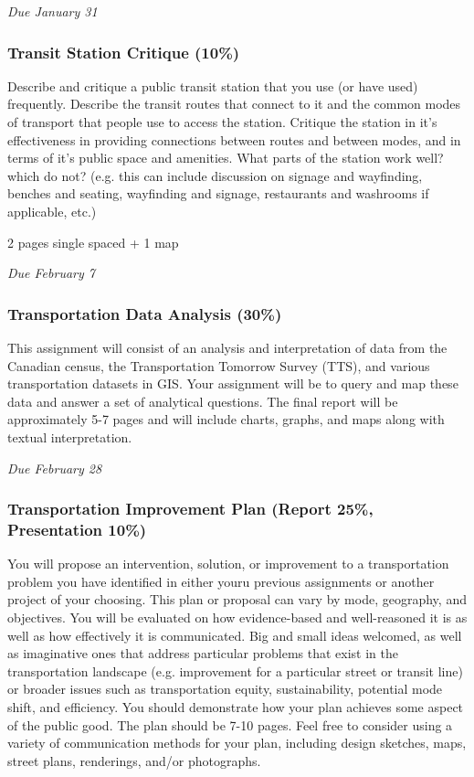 \documentclass[11pt]{article}
\begin{document}
	\textit{Due January 31}
	
	
	\subsubsection*{Transit Station Critique (10\%)}
	
	Describe and critique a public transit station that you use (or have used) frequently. Describe the transit routes that connect to it and the common modes of transport that people use to access the station. Critique the station in it's effectiveness in providing connections between routes and between modes, and in terms of it's public space and amenities. What parts of the station work well? which do not? (e.g. this can include discussion on signage and wayfinding, benches and seating, wayfinding and signage, restaurants and washrooms if applicable, etc.)
	
	2 pages single spaced + 1 map
	
	\textit{Due February 7}
	
	
	
	
	\subsubsection*{Transportation Data Analysis (30\%)}
	
	This assignment will consist of an analysis and interpretation of data from the Canadian census, the Transportation Tomorrow Survey (TTS), and various transportation datasets in GIS. Your assignment will be to query and map these data and answer a set of analytical questions. The final report will be approximately 5-7 pages and will include charts, graphs, and maps along with textual interpretation.
	
	\textit{Due February 28}
	
	\subsubsection*{Transportation Improvement Plan (Report 25\%, Presentation 10\%)}
	
	You will propose an intervention, solution, or
	improvement to a transportation problem you have identified in either youru previous assignments or another project of your choosing. This plan or proposal can vary by mode, geography, and objectives. You will be evaluated on how evidence-based and well-reasoned it is as well as how effectively it is communicated. Big and small ideas welcomed, as well as imaginative ones that address particular problems that exist in the transportation landscape (e.g. improvement for a particular street or transit line) or broader issues such as transportation equity, sustainability, potential mode shift, and efficiency. You should demonstrate how your plan achieves some aspect of the public good. The plan should be 7-10	pages. Feel free to consider using a variety of communication methods for your plan, including design sketches, maps, street plans, renderings, and/or photographs.
	
\end{document}

